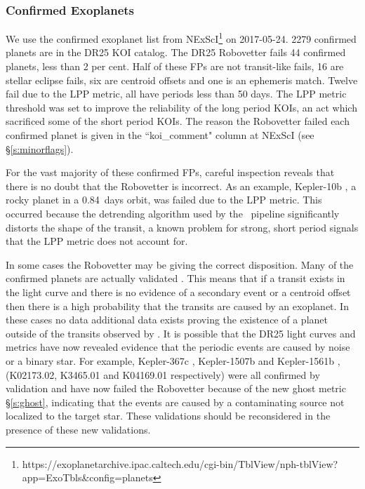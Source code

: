 \subsubsection{Confirmed Exoplanets}
We use the confirmed exoplanet list from NExScI\footnote{https://exoplanetarchive.ipac.caltech.edu/cgi-bin/TblView/nph-tblView?app=ExoTbls\&config=planets} on 2017-05-24.  2279 confirmed planets are in the DR25 KOI catalog.  The DR25 Robovetter fails 44 confirmed planets, less than 2 per cent. Half of these FPs are not transit-like fails, 16 are stellar eclipse fails, six are centroid offsets and one is an ephemeris match. Twelve fail due to the LPP metric, all have periods less than 50 days.  The LPP metric threshold was set to improve the reliability of the long period KOIs, an act which sacrificed some of the short period KOIs.  The reason the Robovetter failed each confirmed planet is given in the ``koi\_comment" column at NExScI (see \S\ref{s:minorflags}). 

For the vast majority of these confirmed FPs, careful inspection reveals that there is no doubt that the Robovetter is incorrect. As an example, Kepler-10b \citep[][]{Batalha2011Kepler10,Fogtmann2014Kepler10}, a rocky planet in a 0.84~days orbit, was failed due to the LPP metric. This occurred because the detrending algorithm used by the \Kepler\ pipeline significantly distorts the shape of the transit, a known problem for strong, short period signals that the LPP metric does not account for.

In some cases the Robovetter may be giving the correct disposition.  Many of the confirmed planets are actually validated \citep{Morton2016,Rowe2014}. This means that if a transit exists in the light curve and there is no evidence of a secondary event or a centroid offset then there is a high probability that the transits are caused by an exoplanet. In these cases no data additional data exists proving the existence of a planet outside of the transits observed by \Kepler. It is possible that the DR25 light curves and metrics have now revealed evidence that the periodic events are caused by noise or a binary star. For example, Kepler-367c \citep{Rowe2014}, Kepler-1507b \citep{Morton2016} and Kepler-1561b \citep{Morton2016}, (K02173.02, K3465.01 and K04169.01 respectively) were all confirmed by validation and have now failed the Robovetter because of the new ghost metric \S\ref{s:ghost}, indicating that the events are caused by a contaminating source not localized to the target star.  These validations should be reconsidered in the presence of these new validations.

